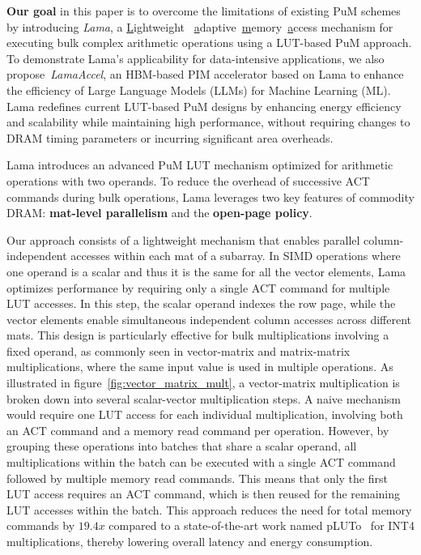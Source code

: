 \textbf{Our goal} in this paper is to overcome the limitations of existing PuM schemes by introducing \textit{Lama}, a \underline{L}ightweight ~\underline{a}daptive~\underline{m}emory~\underline{a}ccess mechanism for executing bulk complex arithmetic operations using a LUT-based PuM approach. To demonstrate Lama's applicability for data-intensive applications, we also propose~\textit{LamaAccel}, an HBM-based PIM accelerator based on Lama to enhance the efficiency of Large Language Models (LLMs) for Machine Learning (ML). Lama redefines current LUT-based PuM designs by enhancing energy efficiency and scalability while maintaining high performance, without requiring changes to DRAM timing parameters or incurring significant area overheads.

Lama introduces an advanced PuM LUT mechanism optimized for arithmetic operations with two operands. To reduce the overhead of successive ACT commands during bulk operations, Lama leverages two key features of commodity DRAM: \textbf{mat-level parallelism} and the \textbf{open-page policy}.


Our approach consists of a lightweight mechanism that enables parallel column-independent accesses within each mat of a subarray. In SIMD operations where one operand is a scalar and thus it is the same for all the vector elements, Lama optimizes performance by requiring only a single ACT command for multiple LUT accesses. In this step, the scalar operand indexes the row page, while the vector elements enable simultaneous independent column accesses across different mats. This design is particularly effective for bulk multiplications involving a fixed operand, as commonly seen in vector-matrix and matrix-matrix multiplications, where the same input value is used in multiple operations. As illustrated in figure~\ref{fig:vector_matrix_mult}, a vector-matrix multiplication is broken down into several scalar-vector multiplication steps. A naive mechanism would require one LUT access for each individual multiplication, involving both an ACT command and a memory read command per operation. However, by grouping these operations into batches that share a scalar operand, all multiplications within the batch can be executed with a single ACT command followed by multiple memory read commands. This means that only the first LUT access requires an ACT command, which is then reused for the remaining LUT accesses within the batch. This approach reduces the need for total memory commands by $19.4x$ compared to a state-of-the-art work named pLUTo~\cite{pluto} for INT4 multiplications, thereby lowering overall latency and energy consumption.


